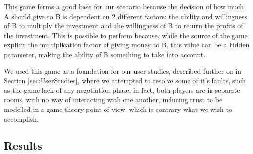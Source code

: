 This game forms a good base for our scenario because the decision of how much A should give to B is dependent on 2 different factors: the ability and willingness of B to multiply the investment and the willingness of B to return the profits of the investment. This is possible to perform because, while the source of the game explicit the multiplication factor of giving money to B, this value can be a hidden parameter, making the ability of B something to take into account.

We used this game as a foundation for our user studies, described further on in Section \ref{sec:UserStudies}, where we attempted to resolve some of it's faults, such as the game lack of any negotiation phase, in fact, both players are in separate rooms, with no way of interacting with one another, inducing trust to be modelled in a game theory point of view, which is contrary what we wish to accomplish.

\subsection{Results}
